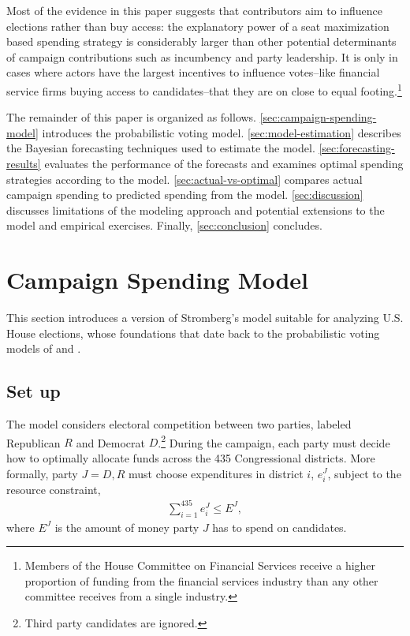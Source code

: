 \documentclass[12pt,final,fleqn]{article}
\theoremstyle{plain}
\begin{document}
Most of the evidence in this paper suggests that contributors aim to influence elections rather than buy access: the explanatory power of a seat maximization based spending strategy is considerably larger than other potential determinants of campaign contributions such as incumbency and party leadership. It is only in cases where actors have the largest incentives to influence votes--like financial service firms buying access to candidates--that they are on close to equal footing.\footnote{Members of the House Committee on Financial Services receive a higher proportion of funding from the financial services industry than any other committee receives from a single industry.}

The remainder of this paper is organized as follows. \autoref{sec:campaign-spending-model} introduces the probabilistic voting model. \autoref{sec:model-estimation} describes the Bayesian forecasting techniques used to estimate the model. \autoref{sec:forecasting-results} evaluates the performance of the forecasts and examines optimal spending strategies according to the model. \autoref{sec:actual-vs-optimal} compares actual campaign spending to predicted spending from the model. \autoref{sec:discussion} discusses limitations of the modeling approach and potential extensions to the model and empirical exercises. Finally, \autoref{sec:conclusion} concludes. 

\section{Campaign Spending Model} \label{sec:campaign-spending-model}
This section introduces a version of Stromberg's \citeyear{stromberg2008electoral} model suitable for analyzing U.S. House elections, whose foundations that date back to the probabilistic voting models of \citet{lindbeck1987balanced} and \citet{dixit1996determinants}. 

\subsection{Set up}
The model considers electoral competition between two parties, labeled Republican $R$ and Democrat $D$.\footnote{Third party candidates are ignored.} During the campaign, each party must decide how to optimally allocate funds across the 435 Congressional districts. More formally, party $J = D, R$ must choose expenditures in district $i$, $e^J_i$, subject to the resource constraint, 
\begin{align} \label{eqn: budget constraint}
\sum_{i=1}^{435} e^J_i \leq E^J,
\end{align}
where $E^J$ is the amount of money party $J$ has to spend on candidates.
\end{document}
